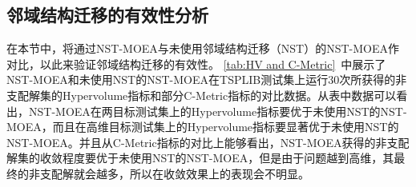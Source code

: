 \subsection{邻域结构迁移的有效性分析}
\label{subsec:NST:实验与讨论:邻域结构迁移的有效性分析}
在本节中，将通过NST-MOEA与未使用邻域结构迁移（NST）的NST-MOEA作对比，以此来验证邻域结构迁移的有效性。
\autoref{tab:HV and C-Metric}~中展示了NST-MOEA和未使用NST的NST-MOEA在TSPLIB测试集上运行30次所获得的非支配解集的Hypervolume指标和部分C-Metric指标的对比数据。从表中数据可以看出，NST-MOEA在两目标测试集上的Hypervolume指标要优于未使用NST的NST-MOEA，而且在高维目标测试集上的Hypervolume指标要显著优于未使用NST的NST-MOEA。并且从C-Metric指标的对比上能够看出，NST-MOEA获得的非支配解集的收敛程度要优于未使用NST的NST-MOEA，但是由于问题越到高维，其最终的非支配解就会越多，所以在收敛效果上的表现会不明显。
\par
